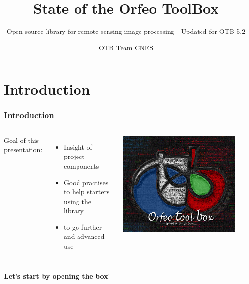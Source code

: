 \documentclass[8pt]{beamer}
\title{State of the Orfeo ToolBox}
\subtitle{Open source library for remote sensing image processing - Updated for
  OTB 5.2}
\author{OTB Team CNES}}%
\date{}
\begin{document}
\begin{frame}
\titlepage
\end{frame}

\section{Introduction}

\begin{frame}
\frametitle{Introduction}
\begin{columns}
Goal of this presentation:
\begin{itemize}
\item Insight of project components 
\item Good practises to help starters using the library
\item to go further and advanced use
\end{itemize}
\includegraphics[width=0.9\textwidth]{images/LOGOTB_blackbox.png}
\end{columns}
\begin{center}
{\huge \color{red}{Orfeo ToolBox is not a black box\ldots}}

\textbf{Let's start by opening the box!}
\end{center}

\end{frame}
\end{document}
